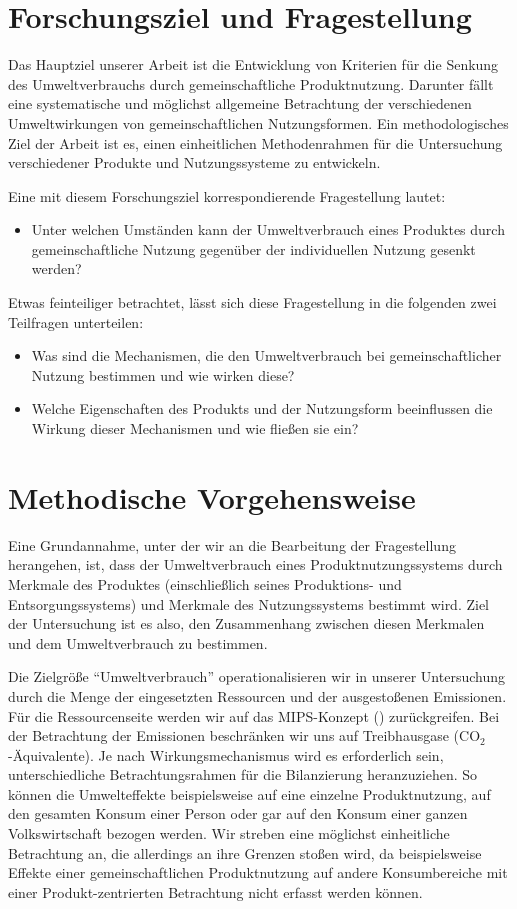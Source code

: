 \documentclass[11pt, titlepage=true]{scrartcl} %
\begin{document}
 
\section{Forschungsziel und Fragestellung}
Das Hauptziel unserer Arbeit ist die Entwicklung von Kriterien für die Senkung des Umweltverbrauchs durch gemeinschaftliche Produktnutzung. Darunter fällt eine systematische und möglichst allgemeine Betrachtung der verschiedenen Umweltwirkungen von gemeinschaftlichen Nutzungsformen. Ein methodologisches Ziel der Arbeit ist es, einen einheitlichen Methodenrahmen für die Untersuchung verschiedener Produkte und Nutzungssysteme zu entwickeln.

Eine mit diesem Forschungsziel korrespondierende Fragestellung lautet:
\begin{itemize}
	\item Unter welchen Umständen kann der Umweltverbrauch eines Produktes durch gemeinschaftliche Nutzung gegenüber der individuellen Nutzung gesenkt werden?
\end{itemize}
Etwas feinteiliger betrachtet, lässt sich diese Fragestellung in die folgenden zwei Teilfragen unterteilen:
\begin{itemize}
	\item Was sind die Mechanismen, die den Umweltverbrauch bei gemeinschaftlicher Nutzung bestimmen und wie wirken diese?
	\item Welche Eigenschaften des Produkts und der Nutzungsform beeinflussen die Wirkung dieser Mechanismen und wie fließen sie ein?
\end{itemize}

\section{Methodische Vorgehensweise}
Eine Grundannahme, unter der wir an die Bearbeitung der Fragestellung herangehen, ist, dass der Umweltverbrauch eines Produktnutzungssystems durch Merkmale des Produktes (einschließlich seines Produktions- und Entsorgungssystems) und Merkmale des Nutzungssystems bestimmt wird. Ziel der Untersuchung ist es also, den Zusammenhang zwischen diesen Merkmalen und dem Umweltverbrauch zu bestimmen.

Die Zielgröße \enquote{Umweltverbrauch} operationalisieren wir in unserer Untersuchung durch die Menge der eingesetzten Ressourcen und der ausgestoßenen Emissionen. Für die Ressourcenseite werden wir auf das MIPS-Konzept (\cite{schmidt-bleek_maia:_1998}) zurückgreifen. Bei der Betrachtung der Emissionen beschränken wir uns auf Treibhausgase (CO$_{2}$-Äquivalente). Je nach Wirkungsmechanismus wird es erforderlich sein, unterschiedliche Betrachtungsrahmen für die Bilanzierung heranzuziehen. So können die Umwelteffekte beispielsweise auf eine einzelne Produktnutzung, auf den gesamten Konsum einer Person oder gar auf den Konsum einer ganzen Volkswirtschaft bezogen werden. Wir streben eine möglichst einheitliche Betrachtung an, die allerdings an ihre Grenzen stoßen wird, da beispielsweise Effekte einer gemeinschaftlichen Produktnutzung auf andere Konsumbereiche mit einer Produkt-zentrierten Betrachtung nicht erfasst werden können.
\end{document}
